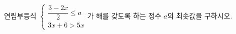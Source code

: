 연립부등식 $\begin{cases} \dfrac{3-2x}{2}\le a \\[4pt] 3x+6>5x \end{cases}$가 해를 갖도록 하는 정수 $a$의 최솟값을 구하시오.
